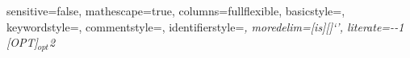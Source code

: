   {
    sensitive=false,
    mathescape=true,
    columns=fullflexible,
    basicstyle=\small,
    keywordstyle=\footnotesize\ttfamily,
    commentstyle=\footnotesize\ttfamily,
    identifierstyle=\small\itshape,
    moredelim=[is][\small\ttfamily]{`}{'},
    literate={-}{{\ttfamily -}}{1}
             {[OPT]}{{{\scriptsize $_{opt}$}}}{2}
  }


\newcommand{\sntx}[1]{\lstinline[language=syntax]!#1!}
